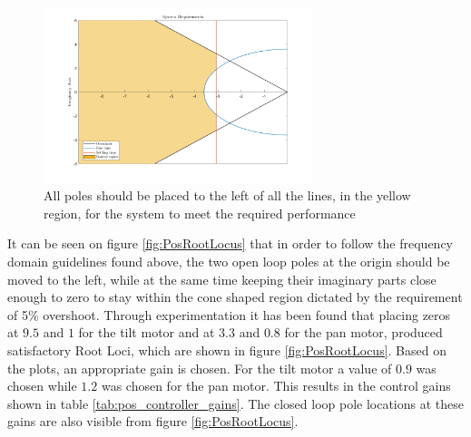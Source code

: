 \documentclass[../../main.tex]{subfiles}
\begin{document}
\begin{figure}
    \centering
    \includegraphics[width=0.7\textwidth]{Sections/System_Design/Images/system_requirements_new.png}
    \caption{All poles should be placed to the left of all the lines, in the yellow region, for the system to meet the required performance}
    \label{fig:system_requirements}
\end{figure}

It can be seen on figure \ref{fig:PosRootLocus} that in order to follow the frequency domain guidelines found above, the two open loop poles at the origin should be moved to the left, while at the same time keeping their imaginary parts close enough to zero to stay within the cone shaped region dictated by the requirement of 5\% overshoot.
Through experimentation it has been found that placing zeros at $9.5$ and $1$ for the tilt motor and at $3.3$ and $0.8$ for the pan motor, produced satisfactory Root Loci, which are shown in figure \ref{fig:PosRootLocus}. Based on the plots, an appropriate gain is chosen. For the tilt motor a value of $0.9$ was chosen while $1.2$ was chosen for the pan motor. This results in the control gains shown in table \ref{tab:pos_controller_gains}. The closed loop pole locations at these gains are also visible from figure \ref{fig:PosRootLocus}.
\end{document}
